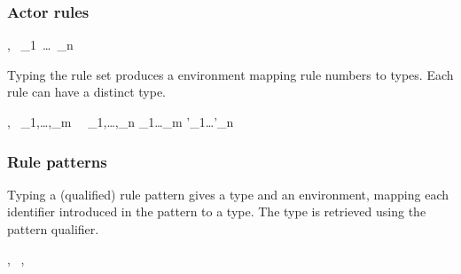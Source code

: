 




\subsubsection{Actor rules}
\label{sec:typing-actor-rules}


{\TE,\VE~ \vdash {}_1~\ldots~_n }

Typing the rule set produces a environment mapping rule numbers to types. Each rule can have a
distinct type. 


{\TE,\VE~ \vdash \langle {}_1,\ldots,_m\rangle
  ~\rightarrow~\langle{}_1,\ldots,_n\rangle \gives
  \tau_1\times\ldots\times\tau_m \rightarrow \tau'_1\times\ldots\times\tau'_n}

\subsubsection{Rule patterns}
\label{sec:typing-rule-patterns}

Typing a (qualified) rule pattern gives a type and an environment, mapping each identifier
introduced in the pattern to a type. The type is retrieved using the pattern qualifier.


{\TE,\VE~\vdash {} \gives {},~  \emptyenv}

